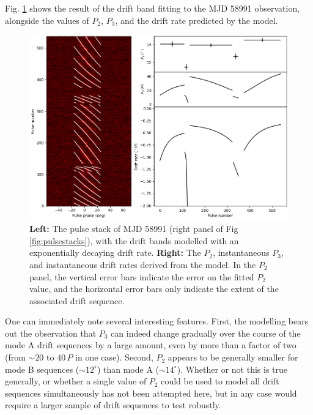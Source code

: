 \documentclass[linenumbers]{aastex631}
\begin{document}
Fig. \ref{fig:with_model} shows the result of the drift band fitting to the MJD 58991 observation, alongside the values of $P_2$, $P_3$, and the drift rate predicted by the model.
\begin{figure}[!tp]
    \centering
    \includegraphics[width=\textwidth]{1274143152_with_model.png}
    \caption{\textbf{Left:} The pulse stack of MJD 58991 (right panel of Fig \ref{fig:pulsestacks}), with the drift bands modelled with an exponentially decaying drift rate. \textbf{Right:} The $P_2$, instantaneous $P_3$, and instantaneous drift rates derived from the model. In the $P_2$ panel, the vertical error bars indicate the error on the fitted $P_2$ value, and the horizontal error bars only indicate the extent of the associated drift sequence.}
    \label{fig:with_model}
\end{figure}
One can immediately note several interesting features.
First, the modelling bears out the observation that $P_3$ can indeed change gradually over the course of the mode A drift sequences by a large amount, even by more than a factor of two (from $\sim20$ to $40\,P$ in one case).
Second, $P_2$ appears to be generally smaller for mode B sequences ($\sim12^\circ$) than mode A ($\sim14^\circ$).
Whether or not this is true generally, or whether a single value of $P_2$ could be used to model all drift sequences simultaneously has not been attempted here, but in any case would require a larger sample of drift sequences to test robustly.
\end{document}
